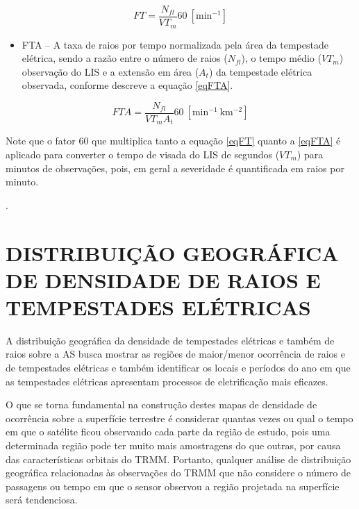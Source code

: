 \begin{equation}
FT = \frac{N_{fl} }{VT_m} 60 ~[\mathrm{min^{-1}}]  
\label{eqFT}  
\end{equation}

\begin{itemize}
\item FTA -- A taxa de raios por tempo normalizada pela área da tempestade elétrica, sendo a razão entre o número de raios ($N_{fl}$), o tempo médio ($VT_m$) observação do LIS e a extensão em área ($A_t$) da tempestade elétrica observada, conforme descreve a equação \ref{eqFTA}.
\end{itemize}

\begin{equation}
FTA = \frac{N_{fl} }{VT_m A_t } 60 ~[\mathrm{min^{-1}~km^{-2}}]
\label{eqFTA}
\end{equation}


Note que o fator 60 que multiplica tanto a equação \ref{eqFT} quanto a \ref{eqFTA} é aplicado para converter o tempo de visada do LIS de segundos ($VT_m$) para minutos de observações, pois, em geral a severidade é quantificada em raios por minuto.


 .


\section{DISTRIBUIÇÃO GEOGRÁFICA DE DENSIDADE DE RAIOS E TEMPESTADES ELÉTRICAS}
\label{metodoPass}



A distribuição geográfica da densidade de tempestades elétricas e também de raios sobre a AS busca mostrar as regiões de maior/menor ocorrência de raios e de tempestades elétricas e também identificar os locais e períodos do ano em que as tempestades elétricas apresentam processos de eletrificação mais eficazes.  

O que se torna fundamental na construção destes mapas de densidade de ocorrência sobre a superfície terrestre é considerar quantas vezes ou qual o tempo em que o satélite ficou observando cada parte da região de estudo, pois uma determinada região pode ter muito mais amostragens do que outras, por causa das características orbitais do TRMM. Portanto, qualquer análise de distribuição geográfica relacionadas às observações do TRMM que não considere o número de passagens ou tempo em que o sensor observou a região projetada na superfície será tendenciosa. 

